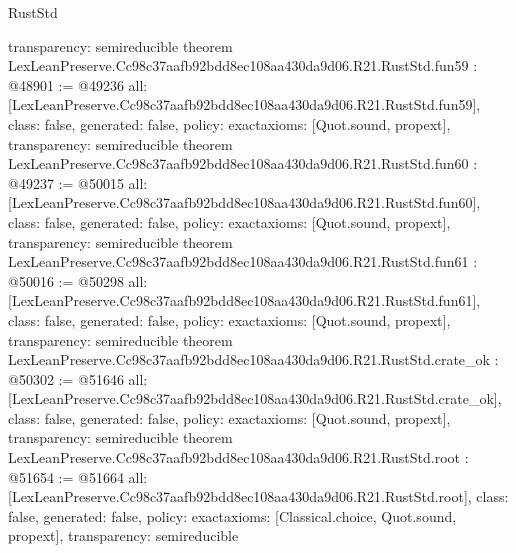 \begin{lexlean}{RustStd}
\begin{coremodule}
{  transparency: semireducible
}
theorem LexLeanPreserve.Cc98c37aafb92bdd8ec108aa430da9d06.R21.RustStd.fun59 : @48901 := @49236 {
  all: [LexLeanPreserve.Cc98c37aafb92bdd8ec108aa430da9d06.R21.RustStd.fun59],
  class: false,
  generated: false,
  policy: exact{axioms: [Quot.sound, propext]},
  transparency: semireducible
}
theorem LexLeanPreserve.Cc98c37aafb92bdd8ec108aa430da9d06.R21.RustStd.fun60 : @49237 := @50015 {
  all: [LexLeanPreserve.Cc98c37aafb92bdd8ec108aa430da9d06.R21.RustStd.fun60],
  class: false,
  generated: false,
  policy: exact{axioms: [Quot.sound, propext]},
  transparency: semireducible
}
theorem LexLeanPreserve.Cc98c37aafb92bdd8ec108aa430da9d06.R21.RustStd.fun61 : @50016 := @50298 {
  all: [LexLeanPreserve.Cc98c37aafb92bdd8ec108aa430da9d06.R21.RustStd.fun61],
  class: false,
  generated: false,
  policy: exact{axioms: [Quot.sound, propext]},
  transparency: semireducible
}
theorem LexLeanPreserve.Cc98c37aafb92bdd8ec108aa430da9d06.R21.RustStd.crate_ok : @50302 := @51646 {
  all: [LexLeanPreserve.Cc98c37aafb92bdd8ec108aa430da9d06.R21.RustStd.crate_ok],
  class: false,
  generated: false,
  policy: exact{axioms: [Quot.sound, propext]},
  transparency: semireducible
}
theorem LexLeanPreserve.Cc98c37aafb92bdd8ec108aa430da9d06.R21.RustStd.root : @51654 := @51664 {
  all: [LexLeanPreserve.Cc98c37aafb92bdd8ec108aa430da9d06.R21.RustStd.root],
  class: false,
  generated: false,
  policy: exact{axioms: [Classical.choice, Quot.sound, propext]},
  transparency: semireducible
}


\end{coremodule}
\end{lexlean}
